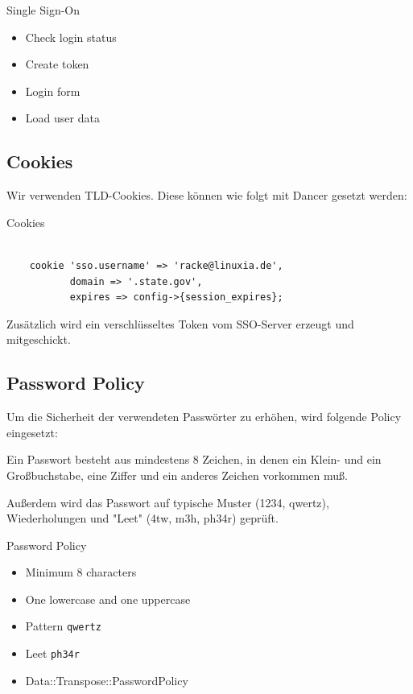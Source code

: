 \begin{frame}{Single Sign-On}
\begin{itemize}
\item Check login status
\item Create token
\item Login form
\item Load user data
\end{itemize}
\end{frame}

\subsection{Cookies}

Wir verwenden TLD-Cookies. Diese können wie folgt mit Dancer
gesetzt werden:

\begin{frame}[fragile]{Cookies}
\begin{lstlisting}

    cookie 'sso.username' => 'racke@linuxia.de',
           domain => '.state.gov',
           expires => config->{session_expires};

\end{lstlisting}
\end{frame}

Zusätzlich wird ein verschlüsseltes Token vom SSO-Server
erzeugt und mitgeschickt.                       
                       
\subsection{Password Policy}

Um die Sicherheit der verwendeten Passwörter zu erhöhen, wird
folgende Policy eingesetzt:

Ein Passwort besteht aus mindestens 8 Zeichen, in denen
ein Klein- und ein Großbuchstabe, eine Ziffer und ein
anderes Zeichen vorkommen muß.

Außerdem wird das Passwort auf typische Muster (1234, qwertz),
Wiederholungen und "Leet" (4tw, m3h, ph34r) geprüft.

\begin{frame}[fragile]{Password Policy}
\begin{itemize}
\item Minimum 8 characters
\item One lowercase and one uppercase
\item Pattern \verb|qwertz|
\item Leet \verb|ph34r|
\item Data::Transpose::PasswordPolicy
\end{itemize}
\end{frame}

